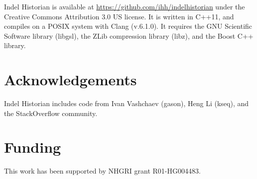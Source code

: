 \documentclass{bioinfo}
\begin{document}
Indel Historian is available at \url{https://github.com/ihh/indelhistorian} under the Creative Commons Attribution 3.0 US license. It is written in C++11, and compiles on a POSIX system with Clang (v.6.1.0). It requires the GNU Scientific Software library (libgsl), the ZLib compression library (libz), and the Boost C++ library.

\section*{Acknowledgements}

Indel Historian includes code from Ivan Vashchaev (gason), Heng Li (kseq), %
and the StackOverflow community.

\section*{Funding}

This work has been supported by NHGRI grant R01-HG004483.


%
%
%
%
%
%
%
%



\end{document}
